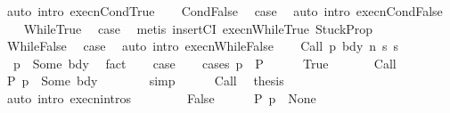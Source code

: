 \begin{isabellebody}
\ {\isacharparenleft}auto\ intro{\isacharcolon}\ execn{\isachardot}CondTrue{\isacharparenright}\isanewline
{}\isamarkupfalse%
\isanewline
\ \ \isamarkupfalse%
\ CondFalse\ \isamarkupfalse%
\ {\isacharquery}case\ \isamarkupfalse%
\ {\isacharparenleft}auto\ intro{\isacharcolon}\ execn{\isachardot}CondFalse{\isacharparenright}\isanewline
{}\isamarkupfalse%
\isanewline
\ \ \isamarkupfalse%
\ WhileTrue\ \isamarkupfalse%
\ {\isacharquery}case\ \isamarkupfalse%
\ {\isacharparenleft}metis\ insertCI\ execn{\isachardot}WhileTrue\ StuckProp{\isacharparenright}\isanewline
{}\isamarkupfalse%
\isanewline
\ \ \isamarkupfalse%
\ WhileFalse\ \isamarkupfalse%
\ {\isacharquery}case\ \isamarkupfalse%
\ {\isacharparenleft}auto\ intro{\isacharcolon}\ execn{\isachardot}WhileFalse{\isacharparenright}\isanewline
{}\isamarkupfalse%
\isanewline
\ \ \isamarkupfalse%
\ {\isacharparenleft}Call\ p\ bdy\ n\ s\ s{\isacharprime}{\isacharparenright}\isanewline
\ \ \isamarkupfalse%
\ {\isachardoublequoteopen}{\isasymGamma}\ p\ {\isacharequal}\ Some\ bdy{\isachardoublequoteclose}\ \isamarkupfalse%
\ fact\isanewline
\ \ \isamarkupfalse%
\ {\isacharquery}case\isanewline
\ \ \isamarkupfalse%
\ {\isacharparenleft}cases\ {\isachardoublequoteopen}p\ {\isasymin}\ P{\isachardoublequoteclose}{\isacharparenright}\isanewline
\ \ \ \ \isamarkupfalse%
\ True\ \isanewline
\ \ \ \ \isamarkupfalse%
\ Call\ \isamarkupfalse%
\ {\isachardoublequoteopen}{\isacharparenleft}{\isasymGamma}{\isacharbar}\isactrlbsub P\isactrlesub {\isacharparenright}\ p\ {\isacharequal}\ Some\ bdy{\isachardoublequoteclose}\isanewline
\ \ \ \ \ \ \isamarkupfalse%
\ {\isacharparenleft}simp{\isacharparenright}\isanewline
\ \ \ \ \isamarkupfalse%
\ Call\ \isamarkupfalse%
\ {\isacharquery}thesis\isanewline
\ \ \ \ \ \ \isamarkupfalse%
\ {\isacharparenleft}auto\ intro{\isacharcolon}\ execn{\isachardot}intros{\isacharparenright}\isanewline
\ \ \isamarkupfalse%
\isanewline
\ \ \ \ \isamarkupfalse%
\ False\isanewline
\ \ \ \ \isamarkupfalse%
\ {\isachardoublequoteopen}{\isacharparenleft}{\isasymGamma}{\isacharbar}\isactrlbsub P\isactrlesub {\isacharparenright}\ p\ {\isacharequal}\ None{\isachardoublequoteclose}\ \isamarkupfalse%

\end{isabellebody}

